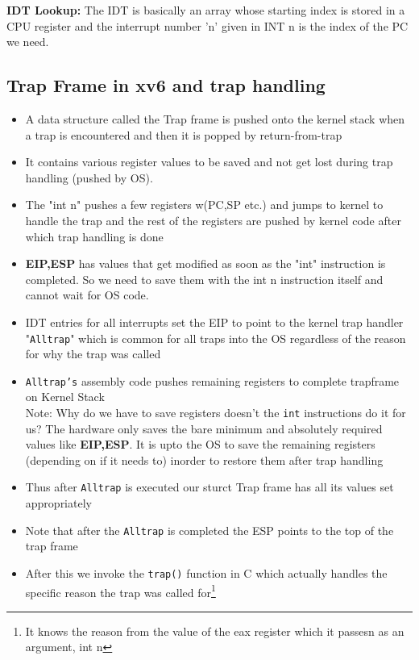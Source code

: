 \documentclass[12pt]{article}
\newcommand{\tbox}[1]{\noindent\fbox{\parbox{\textwidth}{#1}}}
\begin{document}
\textbf{IDT Lookup: }The IDT is basically an array whose starting index is stored in a CPU register and the interrupt number 'n' given in INT n is the index of the PC we need.
\noindent\tbox{
    \begin{center}
    \textbf{\Huge Lecture 7}
    \end{center}
}

\subsection{Trap Frame in xv6 and trap handling}
\begin{itemize}[topsep=0pt, partopsep=0pt, itemsep=0pt, parsep=0pt]
    \item A data structure called the Trap frame is pushed onto the kernel stack when a trap is encountered and then it is popped by return-from-trap
    \item It contains various register values to be saved and not get lost during trap handling (pushed by OS).
    \item The "int n" pushes a few registers w(PC,SP etc.) and jumps to kernel to handle the trap and the rest of the registers are pushed by kernel code after which trap handling is done
    \item \textbf{EIP,ESP} has values that get modified as soon as the "int" instruction is completed. So we need to save them with the int n instruction itself and cannot wait for OS code.
    \item IDT entries for all interrupts set the EIP to point to the kernel trap handler "\texttt{Alltrap}" which is common for all traps into the OS regardless of the reason for why the trap was called
    \item \texttt{Alltrap's} assembly code pushes remaining registers to complete trapframe on Kernel Stack
   \\ Note: Why do we have to save registers doesn't the \texttt{int} instructions do it for us? The hardware only saves the bare minimum and absolutely required values like \textbf{EIP,ESP}.
   It is upto the OS to save the remaining registers (depending on if it needs to) inorder to restore them after trap handling
   \item Thus after \texttt{Alltrap} is executed our sturct Trap frame has all its values set appropriately
    \item Note that after the \texttt{Alltrap} is completed the ESP points to the top of the trap frame
    \item After this we invoke the \texttt{trap()} function in C which actually handles the specific reason the trap was called for\footnote{It knows the reason from the value of the eax register which it passesn as an argument, int n}
\end{itemize}
\end{document}
